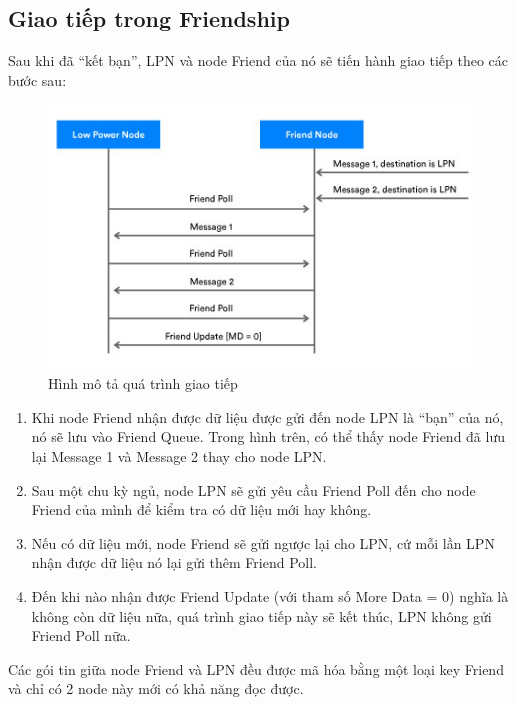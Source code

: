        \subsection{Giao tiếp trong Friendship}
       Sau khi đã ``kết bạn'', LPN và node Friend của nó sẽ tiến hành giao tiếp theo các bước sau:
       \begin{figure}[h!]
        	\begin{center}
        		\includegraphics[scale=0.6]{images/friendship-3.jpg}
        		\caption{Hình mô tả quá trình giao tiếp}
        	\end{center}
          \end{figure}
       \begin{enumerate}
	\item Khi node Friend nhận được dữ liệu được gửi đến node LPN là ``bạn'' của nó, nó sẽ lưu vào Friend Queue. Trong hình trên, có thể thấy node Friend đã lưu lại Message 1 và Message 2 thay cho node LPN.
	\item Sau một chu kỳ ngủ, node LPN sẽ gửi yêu cầu Friend Poll đến cho node Friend của mình để kiểm tra có dữ liệu mới hay không.
	\item Nếu có dữ liệu mới, node Friend sẽ gửi ngược lại cho LPN, cứ mỗi lần LPN nhận được dữ liệu nó lại gửi thêm Friend Poll.
	\item Đến khi nào nhận được Friend Update (với tham số More Data = 0) nghĩa là không còn dữ liệu nữa, quá trình giao tiếp này sẽ kết thúc, LPN không gửi Friend Poll nữa.
      \end{enumerate}
      
      Các gói tin giữa node Friend và LPN đều được mã hóa bằng một loại key Friend và chỉ có 2 node này mới có khả năng đọc được.